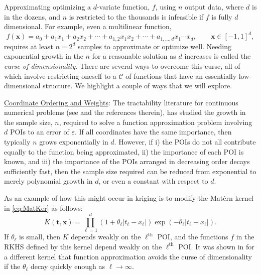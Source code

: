 \documentclass[11pt]{NSFamsart}
\newcommand{\Upara}[1]{\noindent\underline{\upshape #1}:}
\newcommand{\bx}{{\boldsymbol{x}}}
\newcommand{\bt}{{\boldsymbol{t}}}
\newcommand{\calc}{{\mathcal{C}}}
\def\abs#1{\ensuremath{\left \lvert #1 \right \rvert}}
\begin{document}
Approximating optimizing a $d$-variate function, $f$, using $n$ output data, where $d$ is in the dozens, and $n$ is restricted to the thousands is infeasible if $f$ is fully $d$ dimensional. For example, even a multilinear function,
\begin{equation*}
f(\bx) = a_0 + a_1 x_1 + a_2 x_2 + \cdots + a_{1,2} x_1 x_2 + \cdots + a_{1,\ldots, d}x_1 \cdots x_d, \qquad \bx \in [-1,1]^d,
\end{equation*}
requires at least $n = 2^d$ samples to approximate or optimize well. Needing exponential growth in the $n$ for a reasonable solution as $d$ increases is called the \emph{curse of dimensionality}. There are several ways to overcome this curse, all of which involve restricting oneself to a $\calc$ of functions that have an essentially low-dimensional structure. We highlight a couple of ways that we will explore.

\Upara{Coordinate Ordering and Weights}
The tractability literature for continuous numerical problems (see \cite{DicEtal14a,NovWoz08a, NovWoz10a, NovWoz12a} and the references therein), has studied the growth in the sample size, $n$, required to solve a function approximation problem involving $d$ POIs to an error of $\varepsilon$. If all coordinates have the same importance, then typically $n$ grows exponentially in $d$. However, if i) the POIs do not all contribute equally to the function being approximated, ii) the importance of each POI is known, and iii) the importance of the POIs arranged in decreasing order decays sufficiently fast, then the sample size required can be reduced from exponential to merely polynomial growth in $d$, or even a constant with respect to $d$.


As an example of how this might occur in kriging is to modify the Mat\'ern kernel in \eqref{eq:MatKer} as follows:
\begin{equation*}%
K(\bt,\bx) = \prod_{\ell = 1}^d (1 + \theta_\ell \abs{t_\ell-x_\ell}) \exp(-\theta_\ell \abs{t_\ell-x_\ell}).
\end{equation*}
If $\theta_\ell$ is small, then $K$ depends weakly on the $\ell^{\text{th}}$ POI, and the functions $f$ in the RKHS defined by this kernel depend weakly on the $\ell^{\text{th}}$ POI. It was shown in \cite{FasHicWoz12b, FasHicWoz12a} for a different kernel that function approximation avoids the curse of dimensionality if the $\theta_\ell$ decay quickly enough as $\ell \to \infty$.
\end{document}
